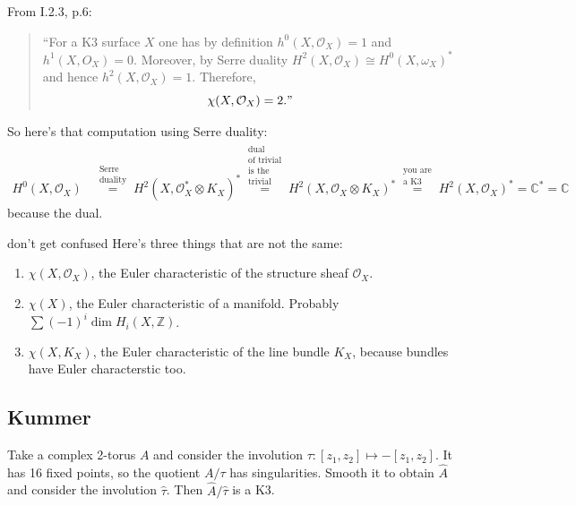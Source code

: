 \begin{remark}[\(\chi(\text{K3},\mathcal{O}_X)=2\)]\leavevmode
From \cite{huk} I.2.3, p.6:
\begin{quotation}
	``For a K3 surface \(X\) one has by definition \(h^{0}(X,\mathcal{O}_X)=1\) and \(h^{1}(X,O_X)=0\). Moreover, by Serre duality \(H^{2}(X,\mathcal{O}_X)\cong H^{0}(X,\omega_X)^*\) and hence \(h^{2}(X,\mathcal{O}_X)=1\). Therefore,
	\[\chi(X,\mathcal{O}_X)=2."\]
\end{quotation}
So here's that computation using Serre duality:
\begin{align*}
H^{0}(X,\mathcal{O}_X)&\overset{\substack{\text{Serre}  \\ \text{duality} } }{=}H^{2}(X,\mathcal{O}_X^*\otimes K_X)^* \overset{\substack{\text{dual}  \\ \text{of trivial} \\ \text{is the}\\\text{trivial} }}{=}H^{2}(X,\mathcal{O}_X \otimes K_X)^* \overset{\substack{\text{you are}  \\ \text{a K3} } }{=}H^{2}(X,\mathcal{O}_X)^*=\mathbb{C}^*=\mathbb{C}
\end{align*}
because the dual.
\end{remark}

\begin{thing7}{don't get confused}\leavevmode
Here's three things that are not the same:
\begin{enumerate}
\item \(\chi(X,\mathcal{O}_X)\), the Euler characteristic of the structure sheaf \(\mathcal{O}_X\).
\item \(\chi(X)\), the Euler characteristic of a manifold. Probably \(\sum (-1)^i \dim H_{i}(X,\mathbb{Z})\).
\item \(\chi(X,K_X)\), the Euler characteristic of the line bundle \(K_X\), because bundles have Euler characterstic too.
\end{enumerate}
\end{thing7}

\subsection{Kummer}

Take a complex 2-torus \(A\) and consider the involution \(\tau:[z_1,z_2]\mapsto -[z_1,z_2]\). It has 16 fixed points, so the quotient \(A/\tau\) has singularities. Smooth it to obtain \(\hat{A}\) and consider the involution \(\hat{\tau}\). Then \(\hat{A}/\hat{\tau}\) is a K3.

